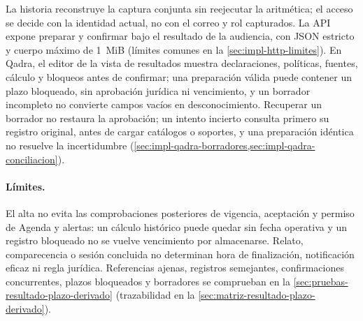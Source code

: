 La historia reconstruye la captura conjunta sin reejecutar la aritmética; el acceso se decide con la identidad actual, no con el correo y rol capturados. La API expone preparar y confirmar bajo el resultado de la audiencia, con JSON estricto y cuerpo máximo de 1~MiB (límites comunes en la \cref{sec:impl-http-limites}). En Qadra, el editor de la vista de resultados muestra declaraciones, políticas, fuentes, cálculo y bloqueos antes de confirmar; una preparación válida puede contener un plazo bloqueado, sin aprobación jurídica ni vencimiento, y un borrador incompleto no convierte campos vacíos en desconocimiento. Recuperar un borrador no restaura la aprobación; un intento incierto consulta primero su registro original, antes de cargar catálogos o soportes, y una preparación idéntica no resuelve la incertidumbre (\cref{sec:impl-qadra-borradores,sec:impl-qadra-conciliacion}).

\paragraph{Límites.} El alta no evita las comprobaciones posteriores de vigencia, aceptación y permiso de Agenda y alertas: un cálculo histórico puede quedar sin fecha operativa y un registro bloqueado no se vuelve vencimiento por almacenarse. Relato, comparecencia o sesión concluida no determinan hora de finalización, notificación eficaz ni regla jurídica. Referencias ajenas, registros semejantes, confirmaciones concurrentes, plazos bloqueados y borradores se comprueban en la \cref{sec:pruebas-resultado-plazo-derivado} (trazabilidad en la \cref{sec:matriz-resultado-plazo-derivado}).

